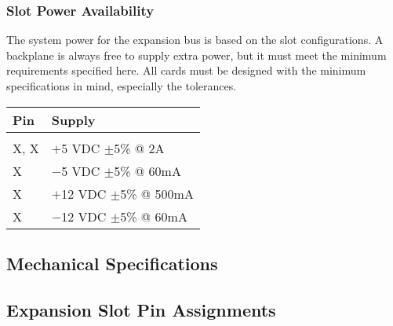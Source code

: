 \documentclass{article}
\begin{document}
\subsubsection{Slot Power Availability}

The system power for the expansion bus is based on the slot configurations. A
backplane is always free to supply extra power, but it must meet the minimum
requirements specified here. All cards must be designed with the minimum
specifications in mind, especially the tolerances.

\begin{center}
	\begin{tabularx}{0.75\textwidth}{X X}
		Pin & Supply \\
		\hline \\
		X, X	& $+$5 VDC $\pm$5\% @ 2A \\
		X	& $-$5 VDC $\pm$5\% @ 60mA \\
		X	& $+$12 VDC $\pm$5\% @ 500mA \\
		X	& $-$12 VDC $\pm$5\% @ 60mA \\
	\end{tabularx}
\end{center}



\subsection{Mechanical Specifications}

\subsection{Expansion Slot Pin Assignments}
\end{document}
